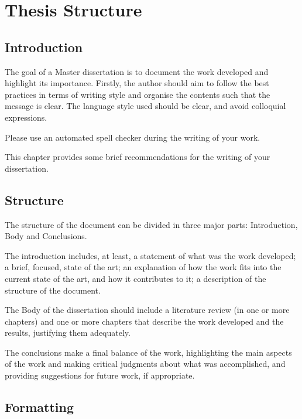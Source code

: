 % 
\chapter{Thesis Structure} %
\label{chap:Chapter1} %


%
\section{Introduction}
\label{sec:chap1_introduction} %

The goal of a Master dissertation is to document the work developed and highlight its importance. Firstly, the author should aim to follow the best practices in terms of writing style and organise the contents such that the message is clear. The language style used should be clear, and avoid colloquial expressions.

Please use an automated spell checker during the writing of your work.

This chapter provides some brief recommendations for the writing of your dissertation.

\section{Structure}

The structure of the document can be divided in three major parts: Introduction, Body and Conclusions.

The introduction includes, at least, a statement of what was the work developed; a brief, focused, state of the art; an explanation of how the work fits into the current state of the art, and how it contributes to it; a description of the structure of the document.

The Body of the dissertation should include a literature review (in one or more chapters) and one or more chapters that describe the work developed and the results, justifying them adequately.

The conclusions make a final balance of the work, highlighting the main aspects of the work and making critical judgments about what was accomplished, and providing suggestions for future work, if appropriate.

\section{Formatting}

